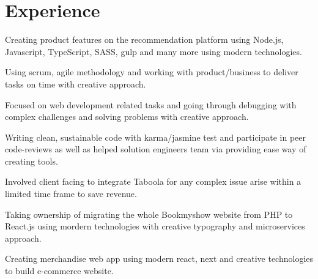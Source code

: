 \documentclass[]{deedy-resume-openfont}
\begin{document}
\begin{minipage}[t]{0.66\textwidth} 


\section{Experience}
\vspace{\topsep}
\begin{tightemize}
\item Creating product features on the recommendation platform using Node.js, Javascript, TypeScript, SASS, gulp and many more using modern technologies.
\item Using scrum, agile methodology and working with product/business to deliver tasks on time with creative approach.
\end{tightemize}
\sectionsep

\begin{tightemize}
\item Focused on web development related tasks and going through debugging with complex challenges and solving problems with creative approach.
\item Writing clean, sustainable code with karma/jasmine test and participate in peer code-reviews as well as helped solution engineers team via providing ease way of creating tools.
\item Involved client facing to integrate Taboola for any complex issue arise within a limited time frame to save revenue.
\end{tightemize}
\sectionsep

\begin{tightemize}
\item  Taking ownership of migrating the whole Bookmyshow website from PHP to React.js using mordern technologies with creative typography and microservices approach.
\item Creating merchandise web app using modern react, next and creative technologies to build e-commerce website.
\end{tightemize}
\sectionsep


\end{minipage}
\end{document}
